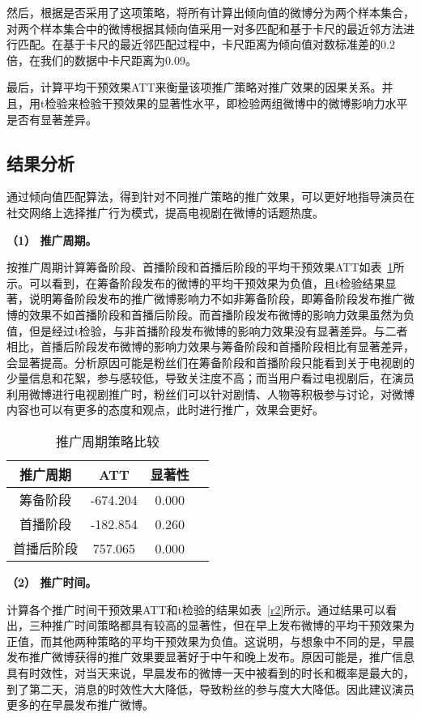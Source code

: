 然后，根据是否采用了这项策略，将所有计算出倾向值的微博分为两个样本集合，对两个样本集合中的微博根据其倾向值采用一对多匹配和基于卡尺的最近邻方法进行匹配。在基于卡尺的最近邻匹配过程中，卡尺距离为倾向值对数标准差的$0.2$倍，在我们的数据中卡尺距离为0.09。

最后，计算平均干预效果ATT来衡量该项推广策略对推广效果的因果关系。并且，用t检验来检验干预效果的显著性水平，即检验两组微博中的微博影响力水平是否有显著差异。

\subsection{结果分析}

通过倾向值匹配算法，得到针对不同推广策略的推广效果，可以更好地指导演员在社交网络上选择推广行为模式，提高电视剧在微博的话题热度。

\textbf{（1） 推广周期。}

按推广周期计算筹备阶段、首播阶段和首播后阶段的平均干预效果ATT如表~\ref{r1}所示。可以看到，在筹备阶段发布的微博的平均干预效果为负值，且t检验结果显著，说明筹备阶段发布的推广微博影响力不如非筹备阶段，即筹备阶段发布推广微博的效果不如首播阶段和首播后阶段。而首播阶段发布微博的影响力效果虽然为负值，但是经过t检验，与非首播阶段发布微博的影响力效果没有显著差异。与二者相比，首播后阶段发布微博的影响力效果与筹备阶段和首播阶段相比有显著差异，会显著提高。分析原因可能是粉丝们在筹备阶段和首播阶段只能看到关于电视剧的少量信息和花絮，参与感较低，导致关注度不高；而当用户看过电视剧后，在演员利用微博进行电视剧推广时，粉丝们可以针对剧情、人物等积极参与讨论，对微博内容也可以有更多的态度和观点，此时进行推广，效果会更好。

\begin{table}[h]
\centering
\caption{推广周期策略比较}
\label{r1}
\begin{tabular}{|c|c|c|c|} \hline
推广周期 & ATT & 显著性\\ \hline
筹备阶段 & -674.204& 0.000\\ \hline
首播阶段 & -182.854& 0.260\\ \hline
首播后阶段 & 757.065 & 0.000\\ 
\hline\end{tabular}

\end{table}

\textbf{（2） 推广时间。}

计算各个推广时间干预效果ATT和t检验的结果如表~\ref{r2}所示。通过结果可以看出，三种推广时间策略都具有较高的显著性，但在早上发布微博的平均干预效果为正值，而其他两种策略的平均干预效果为负值。这说明，与想象中不同的是，早晨发布推广微博获得的推广效果要显著好于中午和晚上发布。原因可能是，推广信息具有时效性，对当天来说，早晨发布的微博一天中被看到的时长和概率是最大的，到了第二天，消息的时效性大大降低，导致粉丝的参与度大大降低。因此建议演员更多的在早晨发布推广微博。

